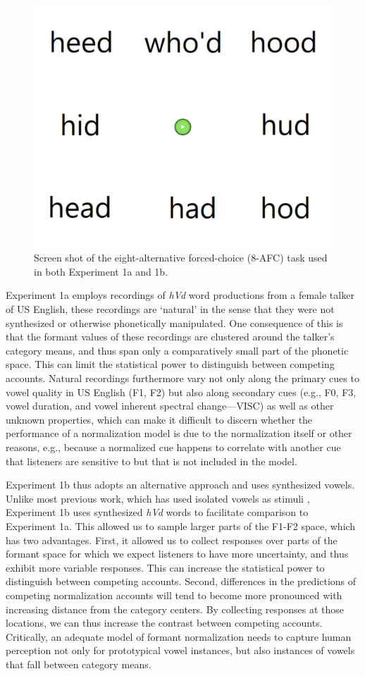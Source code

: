 \documentclass[preprint]{JASA}
\begin{document}
\begin{figure}[!ht]

{\centering \includegraphics[width=0.4\linewidth]{./Figure2} 

}

\caption{Screen shot of the eight-alternative forced-choice (8-AFC) task used in both Experiment 1a and 1b.}\label{fig:exp-procedure}
\end{figure}

Experiment 1a employs recordings of \emph{hVd} word productions from a female talker of US English, these recordings are `natural' in the sense that they were not synthesized or otherwise phonetically manipulated. One consequence of this is that the formant values of these recordings are clustered around the talker's category means, and thus span only a comparatively small part of the phonetic space. This can limit the statistical power to distinguish between competing accounts. Natural recordings furthermore vary not only along the primary cues to vowel quality in US English (F1, F2) but also along secondary cues (e.g., F0, F3, vowel duration, and vowel inherent spectral change---VISC) as well as other unknown properties, which can make it difficult to discern whether the performance of a normalization model is due to the normalization itself or other reasons, e.g., because a normalized cue happens to correlate with another cue that listeners are sensitive to but that is not included in the model.

Experiment 1b thus adopts an alternative approach and uses synthesized vowels. Unlike most previous work, which has used isolated vowels as stimuli \citep{barreda-nearey2012, barreda2021, nearey1989, richter2017}, Experiment 1b uses synthesized \emph{hVd} words to facilitate comparison to Experiment 1a. This allowed us to sample larger parts of the F1-F2 space, which has two advantages. First, it allowed us to collect responses over parts of the formant space for which we expect listeners to have more uncertainty, and thus exhibit more variable responses. This can increase the statistical power to distinguish between competing accounts. Second, differences in the predictions of competing normalization accounts will tend to become more pronounced with increasing distance from the category centers. By collecting responses at those locations, we can thus increase the contrast between competing accounts. Critically, an adequate model of formant normalization needs to capture human perception not only for prototypical vowel instances, but also instances of vowels that fall between category means.
\end{document}
